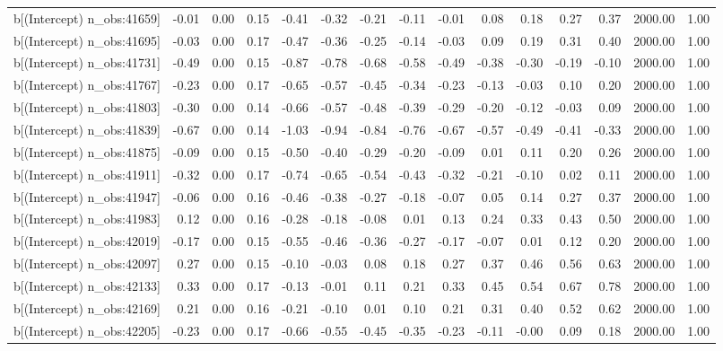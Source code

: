 \begin{table}[ht]
\begin{tabular}{rrrrrrrrrrrrrrr}
  b[(Intercept) n\_obs:41659] & -0.01 & 0.00 & 0.15 & -0.41 & -0.32 & -0.21 & -0.11 & -0.01 & 0.08 & 0.18 & 0.27 & 0.37 & 2000.00 & 1.00 \\ 
  b[(Intercept) n\_obs:41695] & -0.03 & 0.00 & 0.17 & -0.47 & -0.36 & -0.25 & -0.14 & -0.03 & 0.09 & 0.19 & 0.31 & 0.40 & 2000.00 & 1.00 \\ 
  b[(Intercept) n\_obs:41731] & -0.49 & 0.00 & 0.15 & -0.87 & -0.78 & -0.68 & -0.58 & -0.49 & -0.38 & -0.30 & -0.19 & -0.10 & 2000.00 & 1.00 \\ 
  b[(Intercept) n\_obs:41767] & -0.23 & 0.00 & 0.17 & -0.65 & -0.57 & -0.45 & -0.34 & -0.23 & -0.13 & -0.03 & 0.10 & 0.20 & 2000.00 & 1.00 \\ 
  b[(Intercept) n\_obs:41803] & -0.30 & 0.00 & 0.14 & -0.66 & -0.57 & -0.48 & -0.39 & -0.29 & -0.20 & -0.12 & -0.03 & 0.09 & 2000.00 & 1.00 \\ 
  b[(Intercept) n\_obs:41839] & -0.67 & 0.00 & 0.14 & -1.03 & -0.94 & -0.84 & -0.76 & -0.67 & -0.57 & -0.49 & -0.41 & -0.33 & 2000.00 & 1.00 \\ 
  b[(Intercept) n\_obs:41875] & -0.09 & 0.00 & 0.15 & -0.50 & -0.40 & -0.29 & -0.20 & -0.09 & 0.01 & 0.11 & 0.20 & 0.26 & 2000.00 & 1.00 \\ 
  b[(Intercept) n\_obs:41911] & -0.32 & 0.00 & 0.17 & -0.74 & -0.65 & -0.54 & -0.43 & -0.32 & -0.21 & -0.10 & 0.02 & 0.11 & 2000.00 & 1.00 \\ 
  b[(Intercept) n\_obs:41947] & -0.06 & 0.00 & 0.16 & -0.46 & -0.38 & -0.27 & -0.18 & -0.07 & 0.05 & 0.14 & 0.27 & 0.37 & 2000.00 & 1.00 \\ 
  b[(Intercept) n\_obs:41983] & 0.12 & 0.00 & 0.16 & -0.28 & -0.18 & -0.08 & 0.01 & 0.13 & 0.24 & 0.33 & 0.43 & 0.50 & 2000.00 & 1.00 \\ 
  b[(Intercept) n\_obs:42019] & -0.17 & 0.00 & 0.15 & -0.55 & -0.46 & -0.36 & -0.27 & -0.17 & -0.07 & 0.01 & 0.12 & 0.20 & 2000.00 & 1.00 \\ 
  b[(Intercept) n\_obs:42097] & 0.27 & 0.00 & 0.15 & -0.10 & -0.03 & 0.08 & 0.18 & 0.27 & 0.37 & 0.46 & 0.56 & 0.63 & 2000.00 & 1.00 \\ 
  b[(Intercept) n\_obs:42133] & 0.33 & 0.00 & 0.17 & -0.13 & -0.01 & 0.11 & 0.21 & 0.33 & 0.45 & 0.54 & 0.67 & 0.78 & 2000.00 & 1.00 \\ 
  b[(Intercept) n\_obs:42169] & 0.21 & 0.00 & 0.16 & -0.21 & -0.10 & 0.01 & 0.10 & 0.21 & 0.31 & 0.40 & 0.52 & 0.62 & 2000.00 & 1.00 \\ 
  b[(Intercept) n\_obs:42205] & -0.23 & 0.00 & 0.17 & -0.66 & -0.55 & -0.45 & -0.35 & -0.23 & -0.11 & -0.00 & 0.09 & 0.18 & 2000.00 & 1.00 \\ 

\end{tabular}
\end{table}
